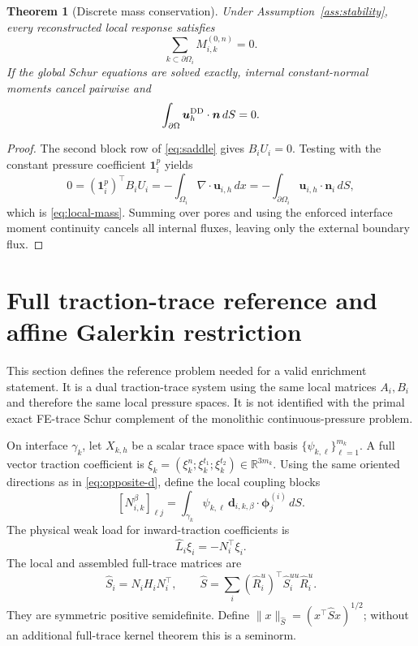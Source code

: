 \documentclass[11pt,a4paper]{article}
\newtheorem{theorem}[assumption]{Theorem}
\newcommand{\R}{\mathbb{R}}
\newcommand{\vel}{\bm{u}}
\newcommand{\normal}{\bm n}
\begin{document}
\begin{theorem}[Discrete mass conservation]\label{thm:mass}
Under Assumption~\ref{ass:stability}, every reconstructed local response
satisfies
\begin{equation}\label{eq:local-mass}
 \sum_{k\subset\partial\Omega_i}M_{i,k}^{(0,n)}=0.
\end{equation}
If the global Schur equations are solved exactly, internal constant-normal
moments cancel pairwise and
\begin{equation}\label{eq:global-mass}
 \int_{\partial\Omega}\vel_h^{\rm DD}\cdot\normal\,dS=0.
\end{equation}
\end{theorem}

\begin{proof}
The second block row of \eqref{eq:saddle} gives $B_iU_i=0$.  Testing with the
constant pressure coefficient $\mathbf1_i^p$ yields
\[
 0=(\mathbf1_i^p)^\top B_iU_i
 =-\int_{\Omega_i}\nabla\cdot\vel_{i,h}\,dx
 =-\int_{\partial\Omega_i}\vel_{i,h}\cdot\normal_i\,dS,
\]
which is \eqref{eq:local-mass}.  Summing over pores and using the enforced
interface moment continuity cancels all internal fluxes, leaving only the
external boundary flux.
\end{proof}

\section{Full traction-trace reference and affine Galerkin restriction}

This section defines the reference problem needed for a valid enrichment
statement.  It is a dual traction-trace system using the same local matrices
$A_i,B_i$ and therefore the same local pressure spaces.  It is not identified
with the primal exact FE-trace Schur complement of the monolithic
continuous-pressure problem.

On interface $\gamma_k$, let $X_{k,h}$ be a scalar trace space with basis
$\{\psi_{k,\ell}\}_{\ell=1}^{m_k}$.  A full vector traction coefficient is
$\xi_k=(\xi_k^n;\xi_k^{t_1};\xi_k^{t_2})\in\R^{3m_k}$.  Using the same
oriented directions as in \eqref{eq:opposite-d}, define the local coupling
blocks
\begin{equation}\label{eq:N}
 [N_{i,k}^{\beta}]_{\ell j}
 =\int_{\gamma_k}\psi_{k,\ell}\,
 \bm d_{i,k,\beta}\cdot\bm\phi_j^{(i)}\,dS.
\end{equation}
The physical weak load for inward-traction coefficients is
\begin{equation}\label{eq:full-load}
 \widehat L_i\xi_i=-N_i^\top\xi_i.
\end{equation}
The local and assembled full-trace matrices are
\begin{equation}\label{eq:fullS}
 \widehat S_i=N_iH_iN_i^\top,
 \qquad
 \widehat S=\sum_i(\widehat R_i^u)^\top
 \widehat S_i^{uu}\widehat R_i^u.
\end{equation}
They are symmetric positive semidefinite.  Define
$\|x\|_{\widehat S}=(x^\top\widehat Sx)^{1/2}$; without an additional
full-trace kernel theorem this is a seminorm.
\end{document}
